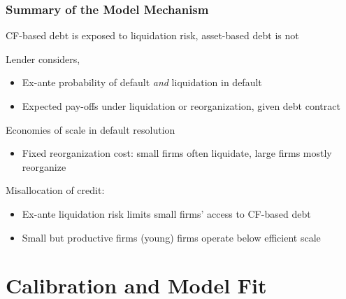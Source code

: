 \documentclass[aspectratio=169,xcolor=table]{beamer}
\begin{document}
\begin{frame}[label=mechanism] \frametitle{Summary of the Model Mechanism}

CF-based debt is exposed to liquidation risk, asset-based debt is not 

Lender considers,
\begin{itemize} \small
    \item Ex-ante probability of default \textit{and} liquidation in default
    \item Expected pay-offs under liquidation or reorganization, given debt contract
    \end{itemize} \normalsize \vspace{3mm} 


Economies of scale in default resolution
\begin{itemize} \small
    \item Fixed reorganization cost: small firms often liquidate, large firms mostly reorganize 
\end{itemize} \normalsize \vspace{3mm} 

Misallocation of credit:
\begin{itemize} \small
    \item Ex-ante liquidation risk limits small firms' access to CF-based debt
    \item Small but productive firms (young) firms operate below efficient scale 
\end{itemize} \normalsize


\end{frame}




\section{Calibration and Model Fit}
\end{document}
